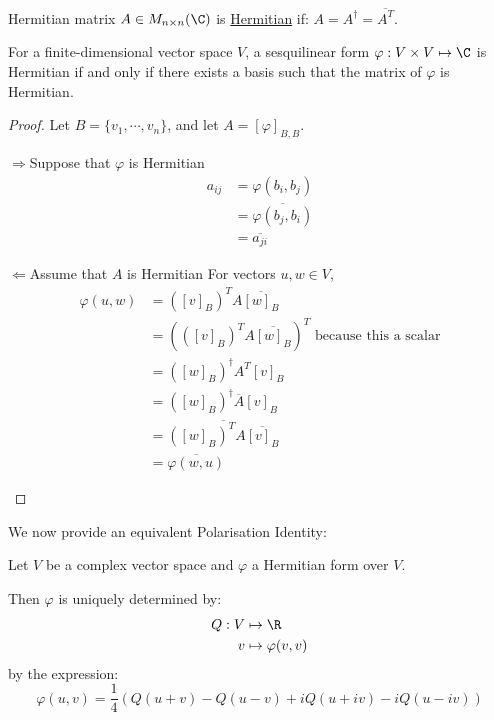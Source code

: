 \documentclass[../Main.tex]{subfiles}
\begin{document}
\begin{definition}{Hermitian matrix}
    $A \in M_{n \times n}(\C)$ is \underline{Hermitian} if:
    $A = A^\dagger = \overline{A^T}$.
\end{definition}
\begin{lemma}
    For a finite-dimensional vector space $V$, a sesquilinear form $\varphi : V \times V \mapsto \C$ is Hermitian if and only if there exists a basis such that the matrix of $\varphi$ is Hermitian.
    \label{lemSFHermitIffMat}
\end{lemma}
\begin{proof}
    Let $B = \{v_1, \cdots, v_n\}$, and let $A = [\varphi]_{B, B}$.
    \begin{proofdirection}{$\Rightarrow$}{Suppose that $\varphi$ is Hermitian}
        \begin{align*}
            a_{ij} &= \varphi(b_i, b_j) \\
            &= \overline{\varphi(b_j, b_i)} \\
            &= \overline{a_{ji}}
        \end{align*}
        \begin{proofdirection}{$\Leftarrow$}{Assume that $A$ is Hermitian}
            For vectors $u, w \in V$,
            \begin{align*}
                \varphi(u, w) &= \left([v]_B\right)^T A \overline{[w]_B} \\
                &= \left(\left([v]_B\right)^T A \overline{[w]_B}\right)^T \text{ because this a scalar} \\
                &= \left([w]_B\right)^\dagger A^T [v]_B \\
                &= \left([w]_B\right)^\dagger \overline{A} [v]_B \\
                &= \overline{\left([w]_B\right)^T A \overline{[v]_B}} \\
                &= \overline{\varphi(w, u)}
            \end{align*}
        \end{proofdirection}
    \end{proofdirection}
\end{proof}
We now provide an equivalent Polarisation Identity:
\begin{proposition}
    Let $V$ be a complex vector space and $\varphi$ a Hermitian form over $V$.

    Then $\varphi$ is uniquely determined by:
    \begin{align*}
        Q : V &\mapsto \R\\
        v &\mapsto \varphi(v, v)
    \end{align*}
    by the expression:
    \begin{equation}
        \varphi(u, v) = \frac14 \left(Q(u + v) - Q(u - v) + iQ(u + iv) - iQ(u - iv)\right)
        \label{eqnPolarisationIdC}
    \end{equation}
    \label{propPolarisationIdC}
\end{proposition}
\end{document}
